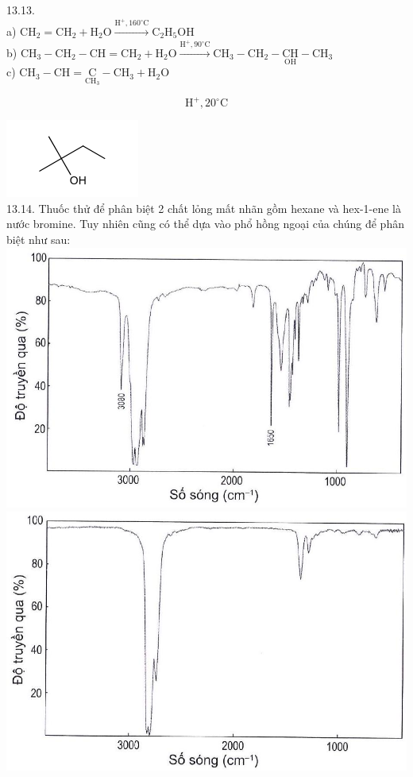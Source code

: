 \documentclass[10pt]{article}
\begin{document}
13.13.\\
a) $\mathrm{CH}_{2}=\mathrm{CH}_{2}+\mathrm{H}_{2} \mathrm{O} \xrightarrow{\mathrm{H}^{+}, 160^{\circ} \mathrm{C}} \mathrm{C}_{2} \mathrm{H}_{5} \mathrm{OH}$\\
b) $\mathrm{CH}_{3}-\mathrm{CH}_{2}-\mathrm{CH}=\mathrm{CH}_{2}+\mathrm{H}_{2} \mathrm{O} \xrightarrow{\mathrm{H}^{+}, 90^{\circ} \mathrm{C}} \mathrm{CH}_{3}-\mathrm{CH}_{2}-\underset{\mathrm{OH}}{\mathrm{CH}}-\mathrm{CH}_{3}$\\
c) $\mathrm{CH}_{3}-\mathrm{CH}=\underset{\mathrm{C} \mathrm{H}_{3}}{\mathrm{C}}-\mathrm{CH}_{3}+ \mathrm{H}_{2} \mathrm{O}$

$$
\mathrm{H}^{+}, 20^{\circ} \mathrm{C}
$$

\includegraphics{smile-9636f45d2488f28c5a61ad001e66297d25ba75b0}\\
13.14. Thuốc thử để phân biệt 2 chất lỏng mất nhãn gồm hexane và hex-1-ene là nước bromine. Tuy nhiên cũng có thể dựa vào phổ hồng ngoại của chúng để phân biệt như sau:\\
\includegraphics[max width=\textwidth, center]{2025_10_23_adad5b98d65ac6665838g-23(2)}\\
\includegraphics[max width=\textwidth, center]{2025_10_23_adad5b98d65ac6665838g-23(3)}
\end{document}
